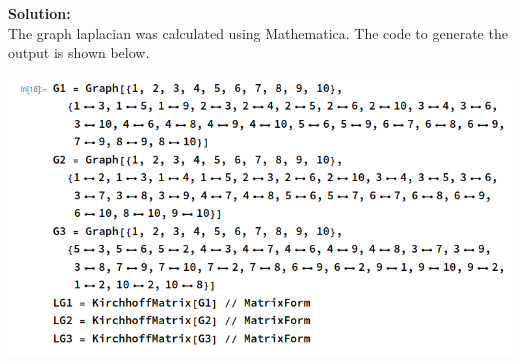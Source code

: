 \documentclass[12pt,a4paper]{article}
\newcommand{\solution}{\noindent\textbf{Solution:}\\}
\begin{document}
\solution
The graph laplacian was calculated using Mathematica. The code to generate the output is shown below.

\includegraphics[width=\textwidth]{code_2.png}
\end{document}
